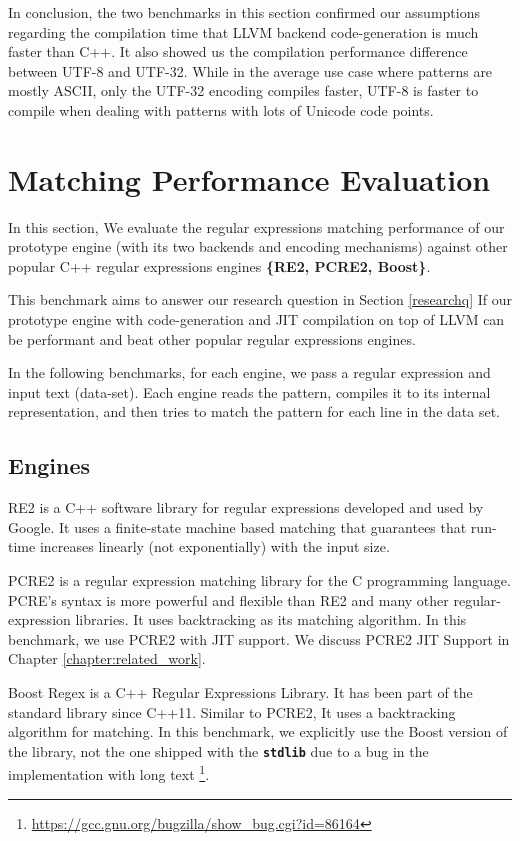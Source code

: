 In conclusion, the two benchmarks in this section confirmed our assumptions regarding the compilation time that LLVM backend code-generation is much faster than C++. It also showed us the compilation performance difference between UTF-8 and UTF-32. While in the average use case where patterns are mostly ASCII, only the UTF-32 encoding compiles faster, UTF-8 is faster to compile when dealing with patterns with lots of Unicode code points.

\section{Matching Performance Evaluation}

In this section, We evaluate the regular expressions matching performance of our prototype engine (with its two backends and encoding mechanisms) against other popular C++ regular expressions engines \textbf{\{RE2, PCRE2, Boost\}}.

This benchmark aims to answer our research question in Section \ref{researchq} If our prototype engine with code-generation and JIT compilation on top of LLVM can be performant and beat other popular regular expressions engines.

In the following benchmarks, for each engine, we pass a regular expression and input text (data-set). Each engine reads the pattern, compiles it to its internal representation, and then tries to match the pattern for each line in the data set.

\subsection{Engines}
RE2 \cite{re2} is a C++ software library for regular expressions developed and used by Google. It uses a finite-state machine based matching that guarantees that run-time increases linearly (not exponentially) with the input size.

PCRE2 \cite{pcre2} is a regular expression matching library for the C programming language. PCRE's syntax is more powerful and flexible than RE2 and many other regular-expression libraries. It uses backtracking as its matching algorithm. In this benchmark, we use PCRE2 with JIT support. We discuss PCRE2 JIT Support in Chapter \ref{chapter:related_work}.

Boost Regex \cite{Boost} is a C++ Regular Expressions Library. It has been part of the standard library since C++11. Similar to PCRE2, It uses a backtracking algorithm for matching. In this benchmark, we explicitly use the Boost version of the library, not the one shipped with the \texttt{\textbf{stdlib}} due to a bug in the implementation with long text \footnote{\url{https://gcc.gnu.org/bugzilla/show\_bug.cgi?id=86164}}.

